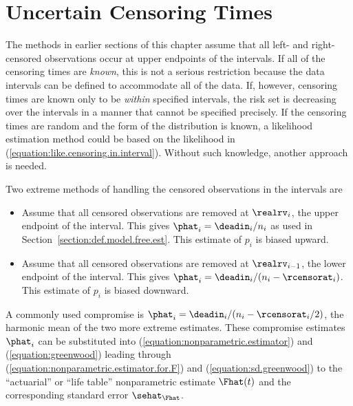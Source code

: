 \section{Uncertain Censoring Times}
\label{section:life.table}
The methods in earlier
sections of this chapter assume that all left- and right-censored
observations occur at upper endpoints of the
intervals. If all of the censoring times are {\em known}, this is not a
serious restriction because the data intervals can be defined to
accommodate all of the data.  If, however, censoring times are known
only to be {\em within} specified intervals, the risk set is
decreasing over the intervals in a manner that cannot be specified
precisely. If the censoring times are random and the
form of the distribution is known, a likelihood estimation
method could be based on the likelihood in
(\ref{equation:like.censoring.in.interval}). Without such knowledge,
another approach is needed.

Two extreme methods of handling the censored observations in the
intervals are
\begin{itemize}
\item
Assume that all censored observations are removed at $\realrv_{i}$,
the upper endpoint of the interval. This gives
$\phat_{i}=\deadin_{i}/n_{i}$ as used in
Section~\ref{section:def.model.free.est}.  This estimate of
$p_{i}$ is biased upward.
\item
Assume that all censored observations are removed at $\realrv_{i-1}$,
the lower endpoint of the interval. This gives
$\phat_{i}=\deadin_{i}/(n_{i}-\rcensorat_{i})$.
This estimate of $p_{i}$ is biased downward.
\end{itemize}
A commonly used compromise is
$\phat_{i}=\deadin_{i}/(n_{i}-\rcensorat_{i}/2)$, the harmonic mean of
the two more extreme estimates.  These compromise estimates
$\phat_{i}$ can be substituted into
(\ref{equation:nonparametric.estimator}) and
(\ref{equation:greenwood}) leading through
(\ref{equation:nonparametric.estimator.for.F}) and
(\ref{equation:sd.greenwood}) to the ``actuarial'' or
``life table'' nonparametric
estimate $\Fhat(t)$ and the corresponding standard error
$\sehat_{\Fhat}$.

